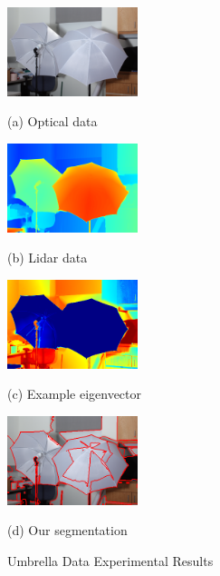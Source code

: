 \documentclass{article}
\begin{document}
\begin{figure}[htb]
  \begin{minipage}[b]{0.48\linewidth}
    \centering
    \centerline{\includegraphics[width=3.8cm]{./Images/Umbrella/optical.png}}
    \centerline{(a) Optical data}\medskip
  \end{minipage}
%
  \begin{minipage}[b]{.48\linewidth}
    \label{fig:lidarData}
    \centering
    \centerline{\includegraphics[width=3.8cm]{./Images/Umbrella/lidarColor.png}}
    \centerline{(b) Lidar data}\medskip
  \end{minipage}

  \begin{minipage}[b]{.48\linewidth}
    \label{fig:evec}
    \centering
    \centerline{\includegraphics[width=3.8cm]{./Images/Umbrella/evecColor.png}}
    \centerline{(c) Example eigenvector}\medskip
  \end{minipage}
%
  \begin{minipage}[b]{.48\linewidth}
    \centering
    \centerline{\includegraphics[width=3.8cm]{./Images/Umbrella/withBorders.png}}
    \centerline{(d) Our segmentation}\medskip
  \end{minipage}
  \caption{Umbrella Data Experimental Results}
  \label{fig:experimentUmbrella}
\end{figure}
\end{document}
